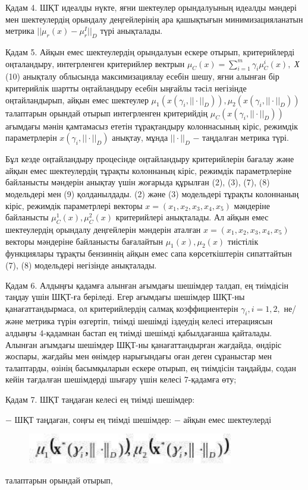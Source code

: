 Қадам 4. ШҚТ идеалды нүкте, яғни шектеулер орындалуының идеалды мәндері
мен шектеулердің орындалу деңгейлерінің ара қашықтығын
минимизацияланатын метрика $||\mu_r(x)-\mu_r^I||_D$ түрі
анықталады.

Қадам 5. Айқын емес шектеулердің орындалуын ескере отырып, критерийлерді
оңталандыру, интегрленген критерийлер вектрын
$\mu_C(x)=\sum_{i=1}^m\gamma_i\mu_C^i(x),$ \emph{Х} (10) анықталу облысында
максимизациялау есебін шешу, яғни алынған бір критерийлік шартты
оңтайландыру есебін ыңғайлы тәсіл негізінде оңтайландырып, айқын емес
шектеулер $\mu_1(x(\gamma_i,||\cdot||_D)),\mu_2(x(\gamma_i,||\cdot||_D))$ талаптарын орындай отырып
интегрленген критерийдің $\mu_C(x(\gamma_i,||\cdot||_D))$ ағымдағы
мәнін қамтамасыз ететін тұрақтандыру колоннасының кіріс, режимдік
параметрлерін $x(\gamma_i,||\cdot||_D)$ анықтау, мұнда
$||\cdot||_D$ − таңдалған метрика түрі.

Бұл кезде оңтайландыру процесінде оңтайландыру критерийлерін бағалау
және айқын емес шектеулердің тұрақты колоннаның кіріс, режимдік
параметрлеріне байланысты мәндерін анықтау үшін жоғарыда құрылған (2),
(3), (7), (8) модельдері мен (9) қолданылдады. (2) және (3) модельдері
тұрақты колоннаның кіріс, режимдік параметрлері векторы
$x=(x_1,x_2,x_3,x_4,x_5)$ мәндеріне байланысты
$\mu_C^1(x),\mu_C^2(x)$ критерийлері анықталады. Ал айқын
емес шектеулердің орындалу деңгейлерін мәндерін аталған
$x=(x_1,x_2,x_3,x_4,x_5)$ векторы мәндеріне байланысты
бағалайтын $\mu_1(x),\mu_2(x)$ тиістілік функциялары
тұрақты бензиннің айқын емес сапа көрсеткіштерін сипаттайтын (7), (8)
модельдері негізінде анықталады.

Қадам 6. Алдыңғы қадамға алынған ағымдағы шешімдер талдап, ең тиімдісін
таңдау үшін ШҚТ-ға беріледі. Егер ағымдағы шешімдер ШҚТ-ны
қанағаттандырмаса, ол критерийлердің салмақ
коэффициентерін $\gamma_i,i=1,2,$ не/және метрика түрін
өзгертіп, тиімді шешімді іздеудің келесі итерациясын алдыңғы 4-қадамнан
бастап ең тиімді шешімді қабылдағанша қайталады. Алынған ағымдағы
шешімдер ШҚТ-ны қанағаттандырған жағдайда, өндіріс жоспары, жағдайы мен
өнімдер нарығындағы оған деген сұраныстар мен талаптарды, өзінің
басымқыларын ескере отырып, ең тиімдісін таңдайды, содан кейін тағдалған
шешімдерді шығару үшін келесі 7-қадамға өту;

Қадам 7. ШҚТ таңдаған келесі ең тиімді шешімдер:

− ШҚТ таңдаған, соңғы ең тиімді шешімдер:
− айқын емес шектеулерді \begin{figure}[H]
	\centering
	\includegraphics[width=0.8\textwidth]{assets/260}
	\caption*{}
\end{figure}талаптарын
орындай отырып,

